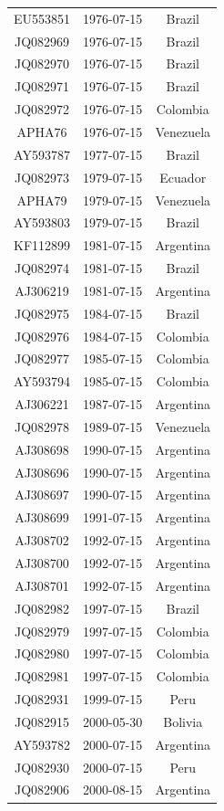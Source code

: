 \documentclass[a4paper,10pt]{article}
\begin{document}
\begin{center}
\begin{longtable}{ccc}
EU553851 & 1976-07-15 & Brazil \\
JQ082969 & 1976-07-15 & Brazil \\
JQ082970 & 1976-07-15 & Brazil \\
JQ082971 & 1976-07-15 & Brazil \\
JQ082972 & 1976-07-15 & Colombia \\
APHA76 & 1976-07-15 & Venezuela \\
AY593787 & 1977-07-15 & Brazil \\
JQ082973 & 1979-07-15 & Ecuador \\
APHA79 & 1979-07-15 & Venezuela \\
AY593803 & 1979-07-15 & Brazil \\
KF112899 & 1981-07-15 & Argentina \\
JQ082974 & 1981-07-15 & Brazil \\
AJ306219 & 1981-07-15 & Argentina \\
JQ082975 & 1984-07-15 & Brazil \\
JQ082976 & 1984-07-15 & Colombia \\
JQ082977 & 1985-07-15 & Colombia \\
AY593794 & 1985-07-15 & Colombia \\
AJ306221 & 1987-07-15 & Argentina \\
JQ082978 & 1989-07-15 & Venezuela \\
AJ308698 & 1990-07-15 & Argentina \\
AJ308696 & 1990-07-15 & Argentina \\
AJ308697 & 1990-07-15 & Argentina \\
AJ308699 & 1991-07-15 & Argentina \\
AJ308702 & 1992-07-15 & Argentina \\
AJ308700 & 1992-07-15 & Argentina \\
AJ308701 & 1992-07-15 & Argentina \\
JQ082982 & 1997-07-15 & Brazil \\
JQ082979 & 1997-07-15 & Colombia \\
JQ082980 & 1997-07-15 & Colombia \\
JQ082981 & 1997-07-15 & Colombia \\
JQ082931 & 1999-07-15 & Peru \\
JQ082915 & 2000-05-30 & Bolivia \\
AY593782 & 2000-07-15 & Argentina \\
JQ082930 & 2000-07-15 & Peru \\
JQ082906 & 2000-08-15 & Argentina \\

\end{longtable}
\end{center}
\end{document}

